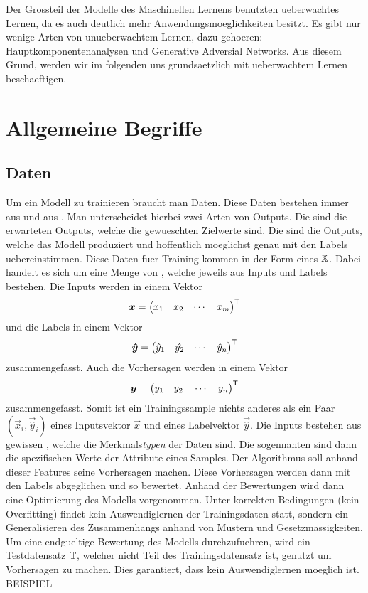 Der Grossteil der Modelle des Maschinellen Lernens benutzten ueberwachtes
Lernen, da es auch deutlich mehr Anwendungsmoeglichkeiten besitzt. Es gibt nur wenige Arten von
unueberwachtem Lernen, dazu gehoeren: Hauptkomponentenanalysen und Generative
Adversial Networks. Aus diesem Grund, werden wir im folgenden uns grundsaetzlich
mit ueberwachtem Lernen beschaeftigen.
\para{}
\cite{wiki:supervised_learning}
\cite{wiki:unsupervised_learning}

\section{Allgemeine Begriffe}

\subsection{Daten}

Um ein Modell zu trainieren braucht man Daten. Diese Daten bestehen immer aus
 und aus . Man unterscheidet hierbei zwei Arten
von Outputs. Die  sind die erwarteten Outputs, welche die
gewueschten Zielwerte sind. Die  sind die Outputs, welche
das Modell produziert und hoffentlich moeglichst genau mit den Labels
uebereinstimmen.
\para{}
Diese Daten fuer Training kommen in der Form eines  $\mathbb{X}$.
Dabei handelt es sich um eine Menge von ,
welche jeweils aus Inputs und Labels bestehen.
Die Inputs werden in einem Vektor
\[ \bm{x} = \begin{pmatrix} x_1 & x_2 & \cdots & x_m \end{pmatrix}^{\mathsf{T}} \]
und die Labels in einem Vektor
\[ \bm{\hat{y}} = \begin{pmatrix} \hat{y}_1 & \hat{y_2} & \cdots & \hat{y}_n \end{pmatrix}^{\mathsf{T}} \]
zusammengefasst. Auch die Vorhersagen werden in einem Vektor
\[\bm{y} = \begin{pmatrix} y_1 \quad y_2 \quad \cdots \quad y_n \end{pmatrix}^{\mathsf{T}} \]
zusammengefasst.
Somit ist ein Trainingssample nichts anderes als ein Paar
$(\vec{x}_i,\vec{\hat{y}}_i)$ eines Inputsvektor $\vec{x}$ und eines Labelvektor
$\vec{\hat{y}}$.
\para{}
Die Inputs bestehen aus gewissen , welche die
Merkmals\textit{typen} der Daten sind. Die sogennanten  sind
dann die spezifischen Werte der Attribute eines Samples. Der Algorithmus soll
anhand dieser Features seine Vorhersagen machen.
Diese Vorhersagen werden dann mit den Labels abgeglichen und so bewertet.
Anhand der Bewertungen wird dann eine Optimierung des Modells vorgenommen.
Unter korrekten Bedingungen (kein Overfitting) findet kein Auswendiglernen der Trainingsdaten statt,
sondern ein Generalisieren des Zusammenhangs anhand von Mustern und Gesetzmassigkeiten.
\para{}
Um eine endgueltige Bewertung des Modells durchzufuehren, wird ein Testdatensatz
$\mathbb{T}$, welcher nicht Teil des Trainingsdatensatz ist, genutzt um Vorhersagen zu machen.
Dies garantiert, dass kein Auswendiglernen moeglich ist.
\para{}
BEISPIEL


